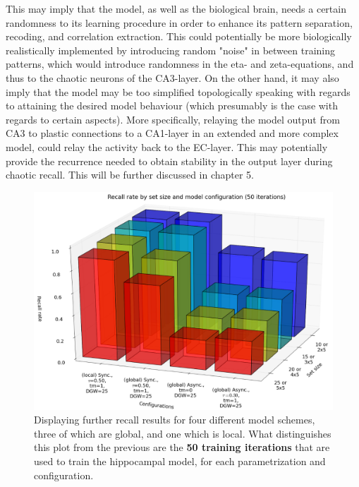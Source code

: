 This may imply that the model, as well as the biological brain, needs a certain randomness to its learning procedure in order to enhance its pattern separation, recoding, and correlation extraction. This could potentially be more biologically realistically implemented by introducing random "noise" in between training patterns, which would introduce randomness in the eta- and zeta-equations, and thus to the chaotic neurons of the CA3-layer.
On the other hand, it may also imply that the model may be too simplified topologically speaking  with regards to attaining the desired model behaviour (which presumably is the case with regards to certain aspects). More specifically, relaying the model output from CA3 to plastic connections to a CA1-layer in an extended and more complex model, could relay the activity back to the EC-layer. This may potentially provide the recurrence needed to obtain stability in the output layer during chaotic recall. This will be further discussed in chapter 5.

\begin{figure}
    \centering
    \includegraphics[width=13cm]{fig/i-iters/50-iters-recall}
    \caption{Displaying further recall results for four different model schemes, three of which are global, and one which is local. What distinguishes this plot from the previous are the \textbf{50 training iterations} that are used to train the hippocampal model, for each parametrization and configuration.}
    \label{fig:50-iters-recall}
\end{figure}

